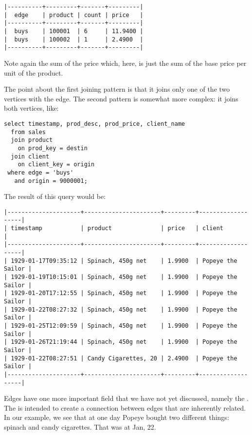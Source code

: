 \begin{verbatim}
|----------+---------+-------+---------|
|  edge    | product | count | price   |
|----------+---------+-------+---------|
|  buys    | 100001  | 6     | 11.9400 |
|  buys    | 100002  | 1     | 2.4900  |
|----------+---------+-------+---------|
\end{verbatim}

Note again the sum of the price which, here,
is just the sum of the base price per unit of the product.

The point about the first joining pattern
is that it joins only one of the two vertices
with the edge. The second pattern is somewhat more complex:
it joins both vertices, like:

\begin{sqlcode}
\begin{lstlisting}
select timestamp, prod_desc, prod_price, client_name
  from sales
  join product
    on prod_key = destin
  join client
    on client_key = origin
 where edge = 'buys'
   and origin = 9000001;
\end{lstlisting}
\end{sqlcode}

The result of this query would be:

\begin{verbatim}
|---------------------+----------------------+---------+-------------------|
| timestamp           | product              | price   | client            |
|---------------------+----------------------+---------+-------------------|
| 1929-01-17T09:35:12 | Spinach, 450g net    | 1.9900  | Popeye the Sailor |
| 1929-01-19T10:15:01 | Spinach, 450g net    | 1.9900  | Popeye the Sailor |
| 1929-01-20T17:12:55 | Spinach, 450g net    | 1.9900  | Popeye the Sailor |
| 1929-01-22T08:27:32 | Spinach, 450g net    | 1.9900  | Popeye the Sailor |
| 1929-01-25T12:09:59 | Spinach, 450g net    | 1.9900  | Popeye the Sailor |
| 1929-01-26T21:19:44 | Spinach, 450g net    | 1.9900  | Popeye the Sailor |
| 1929-01-22T08:27:51 | Candy Cigarettes, 20 | 2.4900  | Popeye the Sailor |
|---------------------+----------------------+---------+-------------------|
\end{verbatim}


Edges have one more important field that we have not yet discussed,
namely the . The  is intended to create a connection
between edges that are inherently related. In our example, we see
that at one day Popeye bought two different things:
spinach and candy cigarettes.
That was at Jan, 22.


